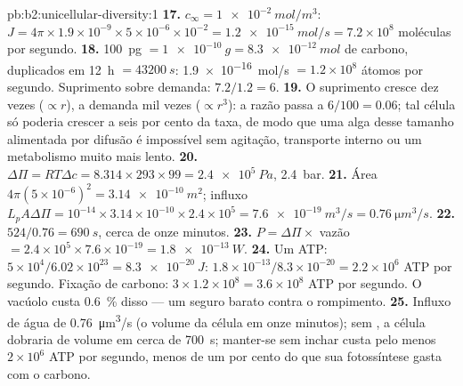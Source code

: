 \begin{solution}{pb:b2:unicellular-diversity:1}
\textbf{17.} $c_\infty = \qty{1e-2}{mol/m^3}$: $J = 4\pi\times
1.9\times 10^{-9}\times 5\times 10^{-6}\times 10^{-2} =
\qty{1.2e-15}{mol/s} = 7.2\times 10^8$ moléculas por segundo.
\textbf{18.} \qty{100}{pg} $= \qty{1e-10}{g} = \qty{8.3e-12}{mol}$ de
carbono, duplicados em \qty{12}{h} $= \qty{43200}{s}$:
\qty{1.9e-16}{mol/s} $= 1.2\times 10^8$ átomos por segundo. Suprimento
sobre demanda: $7.2/1.2 = 6$.
\textbf{19.} O suprimento cresce dez vezes ($\propto r$), a demanda
mil vezes ($\propto r^3$): a razão passa a $6/100 = 0.06$; tal célula
só poderia crescer a seis por cento da taxa, de modo que uma alga
desse tamanho alimentada por difusão é impossível sem agitação,
transporte interno ou um metabolismo muito mais lento.
\textbf{20.} $\Delta\Pi = RT\Delta c = 8.314\times 293\times 99 =
\qty{2.4e5}{Pa}$, \qty{2.4}{bar}.
\textbf{21.} Área $4\pi(5\times 10^{-6})^2 = \qty{3.14e-10}{m^2}$;
influxo $L_p A\Delta\Pi = 10^{-14}\times 3.14\times 10^{-10}\times
2.4\times 10^5 = \qty{7.6e-19}{m^3/s} = \qty{0.76}{\micro m^3/s}$.
\textbf{22.} $524/0.76 = \qty{690}{s}$, cerca de onze minutos.
\textbf{23.} $P = \Delta\Pi\times$ vazão $= 2.4\times 10^5\times
7.6\times 10^{-19} = \qty{1.8e-13}{W}$.
\textbf{24.} Um ATP: $5\times 10^4/6.02\times 10^{23} =
\qty{8.3e-20}{J}$: $1.8\times 10^{-13}/8.3\times 10^{-20} = 2.2\times
10^6$ ATP por segundo. Fixação de carbono: $3\times 1.2\times 10^8 =
3.6\times 10^8$ ATP por segundo. O vacúolo custa \qty{0.6}{\%} disso
--- um seguro barato contra o rompimento.
\textbf{25.} Influxo de água de \qty{0.76}{\micro m^3/s} (o volume da
célula em onze minutos); sem , a célula dobraria de
volume em cerca de \qty{700}{s}; manter-se sem inchar custa pelo menos
$2\times 10^6$ ATP por segundo, menos de um por cento do que sua
fotossíntese gasta com o carbono.
\end{solution}
